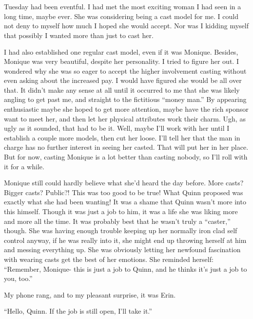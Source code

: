 \chapter{~}
Tuesday had been eventful. I had met the most exciting woman I had seen in a long time,
maybe ever. She was considering being a cast model for me. I could not deny to myself how much I
hoped she would accept. Nor was I kidding myself that possibly I wanted more than just to cast
her.

I had also established one regular cast model, even if it was Monique. Besides, Monique was
very beautiful, despite her personality. I tried to figure her out. I wondered why she was so
eager to accept the higher involvement casting without even asking about the increased pay. I
would have figured she would be all over that. It didn't make any sense at all until it occurred
to me that she was likely angling to get past me, and straight to the fictitious ``money man.''
By appearing enthusiastic maybe she hoped to get more attention, maybe have the rich sponsor
want to meet her, and then let her physical attributes work their charm. Ugh, as ugly as it
sounded, that had to be it. Well, maybe I'll work with her until I establish a couple more
models, then cut her loose. I'll tell her that the man in charge has no further interest in
seeing her casted. That will put her in her place. But for now, casting Monique is a lot better
than casting nobody, so I'll roll with it for a while.

\begin{thought}
Monique still could hardly believe what she'd heard the day before. More casts? Bigger
casts? Public?! This was too good to be true! What Quinn proposed was exactly what she had been
wanting! It was a shame that Quinn wasn't more into this himself. Though it was just a job to
him, it was a life she was liking more and more all the time. It was probably best that he
wasn't truly a ``caster,'' though. She was having enough trouble keeping up her normally iron
clad self control anyway, if he was really into it, she might end up throwing herself at him and
messing everything up. She was obviously letting her newfound fascination with wearing casts get
the best of her emotions. She reminded herself: ``Remember, Monique- this is just a job to
Quinn, and he thinks it's just a job to you, too.''
\end{thought}

My phone rang, and to my pleasant surprise, it was Erin.

``Hello, Quinn. If the job is still open, I'll take it.''

